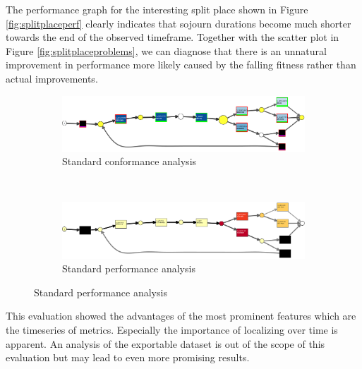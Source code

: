 The performance graph for the interesting split place shown in Figure \ref{fig:splitplaceperf} clearly indicates that sojourn durations become much shorter towards the end of the observed timeframe. Together with the scatter plot in Figure \ref{fig:splitplaceproblems}, we can diagnose that there is an unnatural improvement in performance more likely caused by the falling fitness rather than actual improvements.

\begin{figure}
    \centering
    \begin{subfigure}[t]{0.475\textwidth}
    \centering
    \includegraphics[scale=0.425,angle=90]{figures/evaluation/good_model_conf.png}
    \caption{Standard conformance analysis}
    \label{fig:goodconf}
    \end{subfigure}
    ~
    \begin{subfigure}[t]{0.475\textwidth}
    \centering
    \includegraphics[scale=0.425,angle=90]{figures/evaluation/good_model_perf.png}
    \caption{Standard performance analysis}
    \label{fig:goodperf}
    \end{subfigure}
    \caption{Standard performance analysis}
\end{figure}

This evaluation showed the advantages of the most prominent features which are the timeseries of metrics. Especially the importance of localizing over time is apparent. An analysis of the exportable dataset is out of the scope of this evaluation but may lead to even more promising results.